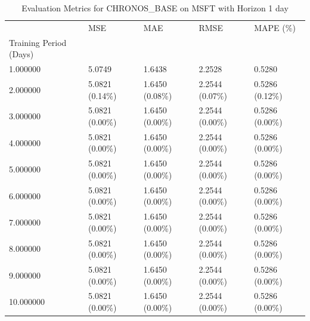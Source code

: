 \begin{table}
\caption{Evaluation Metrics for CHRONOS_BASE on MSFT with Horizon 1 day}
\label{tab:chronos_base_MSFT_h1_metrics}
\begin{tabular}{lllll}
\toprule
 & MSE & MAE & RMSE & MAPE (\%) \\
Training Period (Days) &  &  &  &  \\
\midrule
1.000000 & 5.0749 & 1.6438 & 2.2528 & 0.5280 \\
2.000000 & 5.0821 (0.14\%) & 1.6450 (0.08\%) & 2.2544 (0.07\%) & 0.5286 (0.12\%) \\
3.000000 & 5.0821 (0.00\%) & 1.6450 (0.00\%) & 2.2544 (0.00\%) & 0.5286 (0.00\%) \\
4.000000 & 5.0821 (0.00\%) & 1.6450 (0.00\%) & 2.2544 (0.00\%) & 0.5286 (0.00\%) \\
5.000000 & 5.0821 (0.00\%) & 1.6450 (0.00\%) & 2.2544 (0.00\%) & 0.5286 (0.00\%) \\
6.000000 & 5.0821 (0.00\%) & 1.6450 (0.00\%) & 2.2544 (0.00\%) & 0.5286 (0.00\%) \\
7.000000 & 5.0821 (0.00\%) & 1.6450 (0.00\%) & 2.2544 (0.00\%) & 0.5286 (0.00\%) \\
8.000000 & 5.0821 (0.00\%) & 1.6450 (0.00\%) & 2.2544 (0.00\%) & 0.5286 (0.00\%) \\
9.000000 & 5.0821 (0.00\%) & 1.6450 (0.00\%) & 2.2544 (0.00\%) & 0.5286 (0.00\%) \\
10.000000 & 5.0821 (0.00\%) & 1.6450 (0.00\%) & 2.2544 (0.00\%) & 0.5286 (0.00\%) \\
\bottomrule
\end{tabular}
\end{table}
